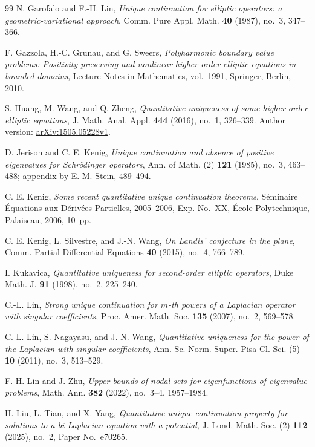 \documentclass[11pt,twoside,leqno]{article}
\numberwithin{equation}{section}
\theoremstyle{definition}
\theoremstyle{remark}
\begin{document}
\begin{thebibliography}{99}
N. Garofalo and F.-H. Lin,
\emph{Unique continuation for elliptic operators: a geometric-variational
approach}, Comm. Pure Appl. Math. \textbf{40} (1987), no.~3, 347--366.

F. Gazzola, H.-C. Grunau, and G. Sweers,
\emph{Polyharmonic boundary value problems: Positivity preserving and
nonlinear higher order elliptic equations in bounded domains},
Lecture Notes in Mathematics, vol.~1991, Springer, Berlin, 2010.

S. Huang, M. Wang, and Q. Zheng,
\emph{Quantitative uniqueness of some higher order elliptic equations},
J. Math. Anal. Appl. \textbf{444} (2016), no.~1, 326--339.
Author version: \href{https://arxiv.org/abs/1505.05228v1}{arXiv:1505.05228v1}.

D. Jerison and C. E. Kenig,
\emph{Unique continuation and absence of positive eigenvalues for
Schr\"odinger operators}, Ann. of Math. (2) \textbf{121} (1985), no.~3,
463--488; appendix by E. M. Stein, 489--494.

C. E. Kenig, \emph{Some recent quantitative unique continuation theorems},
S\'eminaire \'Equations aux D\'eriv\'ees Partielles, 2005--2006,
Exp. No.~XX, \'Ecole Polytechnique, Palaiseau, 2006, 10~pp.

C. E. Kenig, L. Silvestre, and J.-N. Wang,
\emph{On Landis' conjecture in the plane},
Comm. Partial Differential Equations \textbf{40} (2015), no.~4, 766--789.

I. Kukavica, \emph{Quantitative uniqueness for second-order elliptic
operators}, Duke Math. J. \textbf{91} (1998), no.~2, 225--240.

C.-L. Lin, \emph{Strong unique continuation for $m$-th powers of a
Laplacian operator with singular coefficients},
Proc. Amer. Math. Soc. \textbf{135} (2007), no.~2, 569--578.

C.-L. Lin, S. Nagayasu, and J.-N. Wang,
\emph{Quantitative uniqueness for the power of the Laplacian with
singular coefficients},
Ann. Sc. Norm. Super. Pisa Cl. Sci. (5) \textbf{10} (2011), no.~3, 513--529.

F.-H. Lin and J. Zhu,
\emph{Upper bounds of nodal sets for eigenfunctions of eigenvalue problems},
Math. Ann. \textbf{382} (2022), no.~3--4, 1957--1984.

H. Liu, L. Tian, and X. Yang,
\emph{Quantitative unique continuation property for solutions to a
bi-Laplacian equation with a potential},
J. Lond. Math. Soc. (2) \textbf{112} (2025), no.~2, Paper No.~e70265.


\end{thebibliography}
\end{document}
